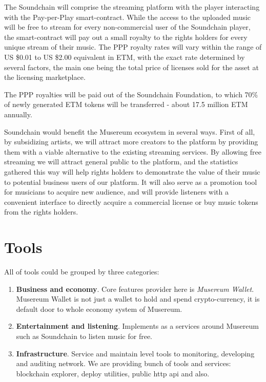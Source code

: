 \documentclass[12pt]{report}
\newcommand{\hlc}[1]{\colorbox{white!25}{#1}}
\begin{document}
\begin{itemize}
The Soundchain will comprise the streaming platform with the player interacting with the Pay-per-Play smart-contract. While the access to the uploaded music will be free to stream for every non-commercial user of the Soundchain player, the smart-contract will pay out a small royalty to the rights holders for every unique stream of their music. The PPP royalty rates will vary within the range of US \$0.01 to US \$2.00 equivalent in ETM, with the exact rate determined by several factors, the main one being the total price of licenses sold for the asset at the licensing marketplace.
 
The PPP royalties will be paid out of the Soundchain Foundation, to which 70\% of newly generated ETM tokens will be transferred - about 17.5 million ETM annually.
 
Soundchain would benefit the Musereum ecosystem in several ways. First of all, by subsidizing artists, we will attract more creators to the platform by providing them with a viable alternative to the existing streaming services. By allowing free streaming we will attract general public to the platform, and the statistics gathered this way will help rights holders to demonstrate the value of their music to potential business users of our platform. It will also serve as a promotion tool for musicians to acquire new audience, and will provide listeners with a convenient interface to directly acquire a commercial license or buy music tokens from the rights holders.

\end{itemize}

\section{\hlc{Tools}}
\label{platform-tools}
All of tools could be grouped by three categories:
\begin{enumerate}
	\item \textbf{Business and economy}. Core features provider here is \textit{Musereum Wallet}. Musereum Wallet is not just a wallet to hold and spend crypto-currency, it is default door to whole economy system of Musereum. 
	\item \textbf{Entertainment and listening}. Implements as a services around Musereum such as Soundchain to listen music for free.
	\item \textbf{Infrastructure}. Service and maintain level tools to monitoring, developing and auditing network. We are providing bunch of tools and services: blockchain explorer, deploy utilities, public http api and also.
\end{enumerate}
\end{document}
